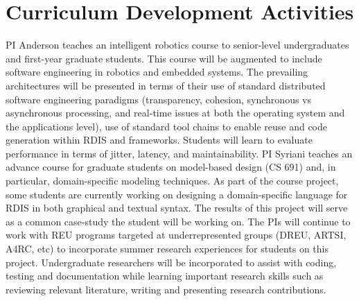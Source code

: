 
\section{Curriculum Development Activities}\label{sec:curriculum}


PI Anderson teaches an intelligent robotics course to senior-level undergraduates and first-year graduate students.  This course will be augmented to include software engineering in robotics and embedded systems.  The prevailing architectures will be presented in terms of their use of standard distributed software engineering paradigms (transparency, cohesion, synchronous vs asynchronous processing, and real-time issues at both the operating system and the applications level), use of standard tool chains to enable reuse and code generation within RDIS and frameworks.  Students will learn to evaluate performance in terms of jitter, latency, and maintainability.  PI Syriani teaches an advance course for graduate students on model-based design (CS 691) and, in particular, domain-specific modeling techniques.  As part of the course project, some students are currently working on designing a domain-specific language for RDIS in both graphical and textual syntax. The results of this project will serve as a common case-study the student will be working on.  The PIs will continue to work with REU programs targeted at underrepresented groups (DREU, ARTSI, A4RC, etc) to incorporate summer research experiences for students on this project.  Undergraduate researchers will be incorporated to assist with coding, testing and documentation while learning important research skills such as reviewing relevant literature, writing and presenting research contributions.